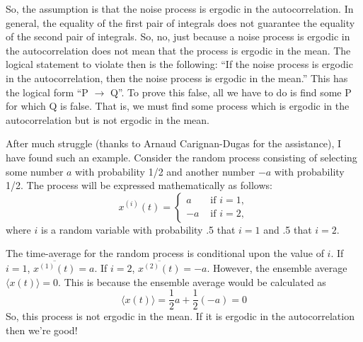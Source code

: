 \begin{homeworkProblem}
So, the assumption is that the noise process is ergodic in the autocorrelation.
In general, the equality of the first pair of integrals does not guarantee the
equality of the second pair of integrals. So, no, just because a noise process
is ergodic in the autocorrelation does not mean that the process is ergodic in
the mean. The logical statement to violate then is the following: ``If the noise
process is ergodic in the autocorrelation, then the noise process is ergodic in
the mean.'' This has the logical form ``P $ \to $ Q''. To prove this false, all
we have to do is find some P for which Q is false. That is, we must find some
process which is ergodic in the autocorrelation but is not ergodic in the mean.

After much struggle (thanks to Arnaud Carignan-Dugas for the assistance), I have
found such an example. Consider the random process consisting of selecting some
number $ a $ with probability 1/2 and another number $ -a $ with probability
1/2. The process will be expressed mathematically as follows:
\[
   x^{(i)}(t) = \begin{cases}
      a &\text{ if } i = 1, \\
      -a &\text{ if } i = 2,
   \end{cases}
   \]
   where $ i $ is a random variable with probability .5 that $ i=1 $ and
   .5 that $ i=2 $.

The time-average for the random process is conditional upon the value of $ i $.
If $ i = 1 $, $ \overline{x^{(1)}(t)} = a $. If $ i = 2 $, $
\overline{x^{(2)}(t)} = -a $. However, the ensemble average $ \langle x(t)
\rangle = 0 $. This is because the ensemble average would be calculated as
\[
   \langle x(t) \rangle = \frac{1}{2}a + \frac{1}{2}(-a) = 0
\]
So, this process is not ergodic in the mean. If it is ergodic in the
autocorrelation then we're good!


\end{homeworkProblem}

